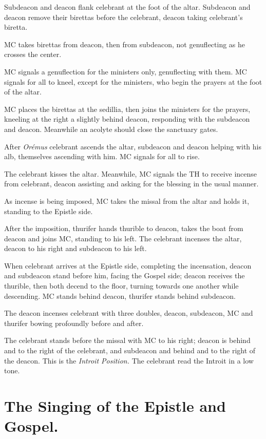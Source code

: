\documentclass[letterpaper, twocolumn]{article}
\begin{document}
	\rubric Subdeacon and deacon flank celebrant at the foot of the altar.
	Subdeacon and deacon remove their birettas before the celebrant, deacon
	taking celebrant's biretta.

	\rubric MC takes birettas from deacon, then from subdeacon, not genuflecting as he
	crosses the center.

	\rubric MC signals a genuflection for the ministers only, genuflecting with
	them. MC signals for all to kneel, except for the ministers, who begin the
	prayers at the foot of the altar.

	\rubric MC places the birettas at the sedillia, then joins the ministers
	for the prayers, kneeling at the right a slightly behind deacon, responding with
	the subdeacon and deacon. Meanwhile an acolyte should close the sanctuary gates.

	\rubric After \textit{Orémus} celebrant ascends the altar, subdeacon and
	deacon helping with his alb, themselves ascending with him. MC signals for
	all to rise.

	\rubric The celebrant kisses the altar. Meanwhile, MC signals the TH to
	receive incense from celebrant, deacon assisting and asking for the
	blessing in the usual manner.

	\rubric As incense is being imposed, MC takes the missal from the altar and
	holds it, standing to the Epistle side. 

	\rubric After the imposition, thurifer hands thurible to deacon, takes the
	boat from deacon and joins MC, standing to his left. The celebrant incenses
	the altar, deacon to his right and subdeacon to his left.

	\rubric When celebrant arrives at the Epistle side, completing the
	incensation, deacon and subdeacon stand before him, facing the Gospel side;
	deacon receives the thurible, then both decend to the floor, turning
	towards one another while descending. MC stands behind deacon, thurifer
	stands behind subdeacon.

	\rubric The deacon incenses celebrant with three doubles, deacon,
	subdeacon, MC and thurifer bowing profoundly before and after.

	\rubric The celebrant stands before the missal with MC to his right; deacon
	is behind and to the right of the celebrant, and subdeacon and behind and
	to the right of the deacon. This is the \textit{Introit Position.} The
	celebrant read the Introit in a low tone.

	\section{The Singing of the Epistle and Gospel.}
\end{document}
